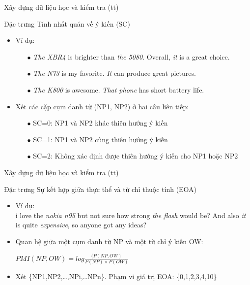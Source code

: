 \documentclass[9pt,xcolor=table]{beamer}
\begin{document}
	\begin{frame}{Xây dựng dữ liệu học và kiểm tra (tt)}
		\begin{block}{Đặc trưng Tính nhất quán về ý kiến (SC)}
			\begin{itemize}
				\item{Ví dụ:\\
				\begin{itemize}
					\item[$\bullet$]{\textit{The XBR4} is brighter than \textit{the 5080}. Overall, \textit{it} is a great choice.}
					\item[$\bullet$]{\textit{The N73} is my favorite. \textit{It} can produce great pictures.}
					\item[$\bullet$]{\textit{The K800} is awesome. \textit{That phone} has short battery life.}
				\end{itemize}}
				\item{Xét các cặp cụm danh từ (NP1, NP2) ở hai câu liên tiếp: \\
					\begin{itemize}
						\item[$\bullet$]{SC=0: NP1 và NP2 khác thiên hướng ý kiến}
						\item[$\bullet$]{SC=1: NP1 và NP2 cùng thiên hướng ý kiến}
						\item[$\bullet$]{SC=2: Không xác định được thiên hướng ý kiến cho NP1 hoặc NP2}
					\end{itemize}}
			\end{itemize}
		\end{block}		
	\end{frame}

	\begin{frame}{Xây dựng dữ liệu học và kiểm tra (tt)}
		\begin{block}{Đặc trưng Sự kết hợp giữa thực thể và từ chỉ thuộc tính (EOA)}
			\begin{itemize}
				\item{Ví dụ:\\
				i love the \textit{nokia n95} but not sure how strong \textit{the flash} would be? And also \textit{it} is quite \textit{expensive}, so anyone got any ideas?}				
				\item{Quan hệ giữa một cụm danh từ NP và một từ chỉ ý kiến OW: \\
					\begin{center}
						$PMI(NP,OW) = log\frac{(P(NP,OW)}{P(NP)\times P(OW)}$
					\end{center}}
				\item{Xét \{NP1,NP2,…,NPi,…NPn\}. Phạm vi giá trị EOA: \{0,1,2,3,4,10\}}
			\end{itemize}
		\end{block}		
	\end{frame}
\end{document}
